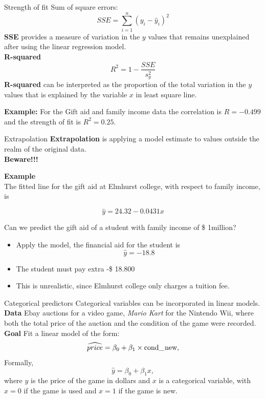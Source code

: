 \documentclass[12pt,a4paper]{beamer}
\begin{document}
\begin{frame}{Strength of fit}
	Sum of square errors:
	\[SSE=\sum_{i=1}^{n}(y_i-\hat{y}_i)^2\]
	\textbf{SSE} provides a measure of variation in the $y$ values that remains unexplained after using the linear regression model.\\
	\textbf{R-squared}
     \[R^2=1-\frac{SSE}{s_y^2}\]
\textbf{R-squared} can be interpreted as the proportion of the total variation in the $y$ values that is explained by the variable $x$ in least square line.

\textbf{Example:} For the Gift aid and family income data the correlation is $R=-0.499$ and the strength of fit is $R^2=0.25$.
\end{frame}
\begin{frame}{Extrapolation}
\small	\textbf{Extrapolation} is applying a model estimate to values outside the realm of the original data.\\
	
\textbf{Beware!!!}

\textbf{Example}\\
\small The fitted line for the gift aid at Elmhurst college, with respect to family income, is 

	\[\hat{y} = 24.32 - 0.0431 x\]

Can we predict the gift aid of a student with family income of \$ 1million?
\begin{itemize}
	\item Apply the model, the financial aid for the student is 
	\[\hat{y}=-18.8\]
	\item The student must pay extra -\$ 18.800
	\item This is unrealistic, since Elmhurst college only charges a tuition fee.
\end{itemize}
\end{frame}
\begin{frame}{Categorical predictors}
\small	Categorical variables can be incorporated in linear models.\\
	
\textbf{Data} Ebay auctions for a video game, \emph{Mario Kart} for the Nintendo Wii, where both the total price of the auction and the condition of the game were recorded.\\
\textbf{Goal} Fit a linear model of the form:\\
\[\widehat{price} = \beta_0 + \beta_1 \times \text{cond\_\hspace{0.3mm}new},\]
Formally, 
\[\hat{y}=\beta_0+\beta_1 x,\]
where $y$ is the price of the game in dollars and $x$ is a categorical variable, with $x=0$ if the game is used and $x=1$ if the game is new. 
\end{frame}
\end{document}
